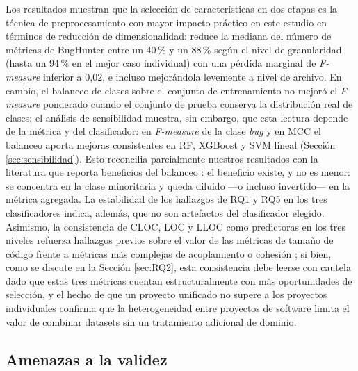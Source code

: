 \documentclass[conference,a4paper]{IEEEtran}
\begin{document}
Los resultados muestran que la selección de características en dos etapas es la técnica de preprocesamiento con mayor impacto práctico en este estudio en términos de reducción de dimensionalidad: reduce la mediana del número de métricas de BugHunter entre un 40\,\% y un 88\,\% según el nivel de granularidad (hasta un 94\,\% en el mejor caso individual) con una pérdida marginal de \textit{F-measure} inferior a 0,02, e incluso mejorándola levemente a nivel de archivo. En cambio, el balanceo de clases sobre el conjunto de entrenamiento no mejoró el \textit{F-measure} ponderado cuando el conjunto de prueba conserva la distribución real de clases; el análisis de sensibilidad muestra, sin embargo, que esta lectura depende de la métrica y del clasificador: en \textit{F-measure} de la clase \textit{bug} y en MCC el balanceo aporta mejoras consistentes en RF, XGBoost y SVM lineal (Sección \ref{sec:sensibilidad}). Esto reconcilia parcialmente nuestros resultados con la literatura que reporta beneficios del balanceo \cite{tantithamthavorn2020,rathi2023}: el beneficio existe, y no es menor: se concentra en la clase minoritaria y queda diluido ---o incluso invertido--- en la métrica agregada. La estabilidad de los hallazgos de RQ1 y RQ5 en los tres clasificadores indica, además, que no son artefactos del clasificador elegido. Asimismo, la consistencia de CLOC, LOC y LLOC como predictoras en los tres niveles refuerza hallazgos previos sobre el valor de las métricas de tamaño de código frente a métricas más complejas de acoplamiento o cohesión \cite{radjenovic2013}; si bien, como se discute en la Sección \ref{sec:RQ2}, esta consistencia debe leerse con cautela dado que estas tres métricas cuentan estructuralmente con más oportunidades de selección, y el hecho de que un proyecto unificado no supere a los proyectos individuales confirma que la heterogeneidad entre proyectos de software limita el valor de combinar datasets sin un tratamiento adicional de dominio.

\subsection{Amenazas a la validez}
\label{sec:amenazas}
\end{document}
